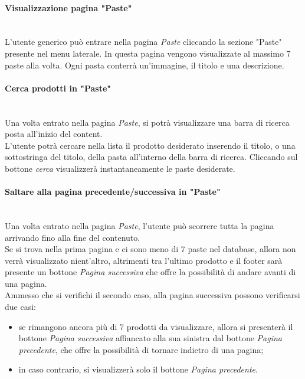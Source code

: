 \paragraph{Visualizzazione pagina "Paste"}\mbox{}\\
\label{par:VisPaste}
L'utente generico può entrare nella pagina \emph{Paste} cliccando la sezione "Paste" presente nel menu laterale.
In questa pagina vengono visualizzate al massimo 7 paste alla volta. Ogni pasta conterrà un'immagine, il titolo e una descrizione.\\ 

\paragraph{Cerca prodotti in "Paste"}\mbox{}\\
\label{par:CerPaste}
Una volta entrato nella pagina \emph{Paste}, si potrà visualizzare una barra di ricerca posta all'inizio del content.\\
L'utente potrà cercare nella lista il prodotto desiderato inserendo il titolo, o una sottostringa del titolo, della pasta all'interno della barra di ricerca. Cliccando sul bottone \emph{cerca} visualizzerà instantaneamente le paste desiderate.

\paragraph{Saltare alla pagina precedente/successiva in "Paste"}\mbox{}\\
\label{par:PrevNextPaste}
Una volta entrato nella pagina \emph{Paste}, l'utente può scorrere tutta la pagina arrivando fino alla fine del contenuto.\\
Se si trova nella prima pagina e ci sono meno di 7 paste nel database, allora non verrà visualizzato nient'altro, altrimenti tra l'ultimo prodotto e il footer sarà presente un bottone \emph{Pagina successiva} che offre la possibilità di andare avanti di una pagina.\\
Ammesso che si verifichi il secondo caso, alla pagina successiva possono verificarsi due casi:
\begin{itemize}
	\item se rimangono ancora più di 7 prodotti da visualizzare, allora si presenterà il bottone \emph{Pagina successiva} affiancato alla sua sinistra dal bottone \emph{Pagina precedente}, che offre la possibilità di tornare indietro di una pagina;
	\item in caso contrario, si visualizzerà solo il bottone \emph{Pagina precedente}.
\end{itemize}	

